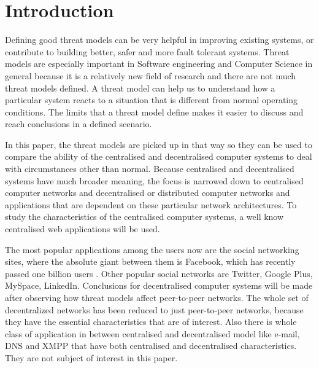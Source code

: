 \section{Introduction}
Defining good threat models can be very helpful in improving existing systems, or contribute to building better, safer and more fault tolerant systems. Threat models are especially important in Software engineering and Computer Science in general because it is a relatively new field of research and there are not much threat models defined. A threat model can help us to understand how a particular system reacts to a situation that is different from normal operating conditions. The limits that a threat model define makes it easier to discuss and reach conclusions in a defined scenario.

In this paper, the threat models are picked up in that way so they can be used to compare the ability of the centralised and decentralised computer systems to deal with circumstances other than normal. Because centralised and decentralised systems have much broader meaning, the focus is narrowed down to centralised computer networks and decentralised or distributed computer networks and applications that are dependent on these particular network architectures. To study the characteristics of the centralised computer systems, a well know centralised web applications will be used. 

The most popular applications among the users now are the social networking sites, where the absolute giant between them is Facebook, which has recently passed one billion users \cite{web:facebookpassesbillion}. Other popular social networks are Twitter, Google Plus, MySpace, LinkedIn. Conclusions for decentralised computer systems will be made after observing how threat models affect peer-to-peer networks. The whole set of decentralized networks has been reduced to just peer-to-peer networks, because they have the essential characteristics that are of interest. Also there is whole class of application in between centralised and decentralised model like e-mail, DNS and XMPP that have both centralised and decentralised characteristics. They are not subject of interest in this paper.

